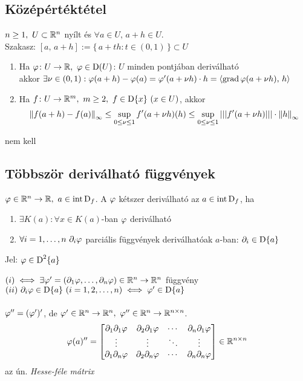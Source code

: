 \subsection{Középértéktétel}
\begin{te}
  $n\geq1,~U\subset\mathbb{R}^n$ nyílt és $\forall a\in U,\,a+h\in U$.\\
  Szakasz: $[a,\,a+h] := \{\,a+th:t\in(0,1)\,\}\subset U$
  {\listazjbetu
    \begin{enumerate}
    \item Ha $\vfi\colon U\n\R,\ \vfi\in\D(U)$: $U$ minden pontjában deriválható\\
      akkor $\exists \nu\in(0,1):\varphi(a+h)-\varphi(a)=\varphi'(a+\nu h)\cdot h=\langle\operatorname{grad}\varphi(a+\nu h),\,h\rangle$
    \item Ha $f\colon U\n\R^m,\ m\geq2,\ f\in\der{x}\ (x\in U)$, akkor
      \[ \left\Vert f(a+h)-f(a)\right\Vert_\infty\leq \displaystyle\sup_{0\leq\nu\leq1} f'(a+\nu h)(h) \leq
      \sup_{0\leq\nu\leq1}|||f'(a+\nu h)|||\cdot \left\Vert h\right\Vert_\infty\]
    \end{enumerate}  
  }
\end{te}
\begin{biz} nem kell
\end{biz}

\subsection{Többször deriválható függvények}
\begin{de}
  $\varphi\in\mathbb{R}^n\to\mathbb{R},\ a\in\operatorname{int\,D}_f$. A $\varphi$ kétszer deriválható az $a\in\operatorname{int\,D}_f$, ha
  {\listazjromai
    \begin{enumerate}
    \item $\exists K(a)\colon \forall x\in K(a)$-ban $\varphi$ deriválható
    \item $\forall i=1,\dotsc,n\ \partial_i\vfi$ parciális függvények deriválhatóak $a$-ban: $\partial_i\in\operatorname{D}\{a\}$
    \end{enumerate}
  }
  Jel: $\varphi \in\operatorname{D}^{2}\{a\}$
\end{de}
\begin{megj}
  $(i) \iff \exists\varphi'=(\partial_1\varphi,\dotsc,\partial_n\varphi)\in\mathbb{R}^n\to\mathbb{R}^n$ függvény\\
  $(ii)\ \partial_i\vfi\in\der{a}\ (i=1,2,\dotsc,n) \ekviv \vfi'\in\der{a}$\\\\
  $\varphi'' = (\varphi')'$, de $\varphi'\in\mathbb{R}^n\to\mathbb{R}^n,\ \varphi''\in\mathbb{R}^n\to\mathbb{R}^{n\times n}$.\\
  \[\varphi(a)'' = \begin{bmatrix}
  \partial_1\partial_1\varphi &\partial_2\partial_1\varphi & \cdots & \partial_n\partial_1\varphi \\
  \vdots & \vdots & \ddots & \vdots \\
  \partial_1\partial_n\varphi &\partial_2\partial_n\varphi & \cdots & \partial_n\partial_n\varphi 
  \end{bmatrix}\in\mathbb{R}^{n\times n}\]
  az ún. \emph{Hesse-féle mátrix}  
\end{megj}

